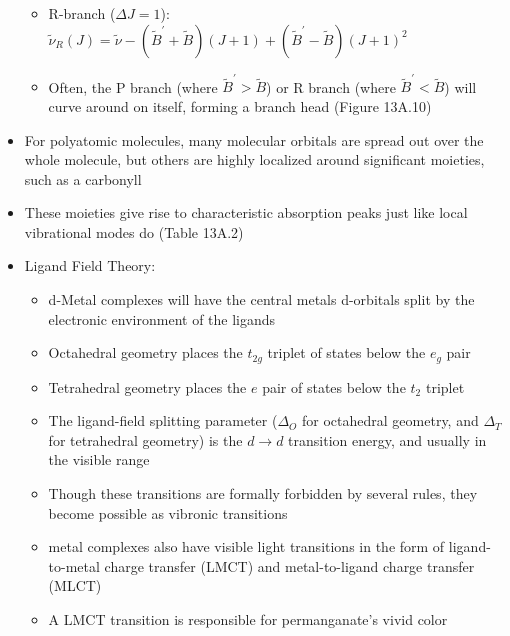 \documentclass[12pt, openany, letterpaper]{memoir}
\begin{document}
\begin{itemize}
\begin{itemize}
		\item R-branch ($\Delta J=1$):  $\tilde{\nu}_R(J) = \tilde{\nu}-\left(\tilde{B}^\prime + \tilde{B}\right)(J+1) + \left(\tilde{B}^\prime - \tilde{B}\right)(J+1)^2$
		\item Often, the P branch (where $\tilde{B}^\prime>\tilde{B}$) or R branch (where $\tilde{B}^\prime < \tilde{B}$) will curve around on itself, forming a branch  head (Figure 13A.10)
	\end{itemize}
	\item For polyatomic molecules, many molecular orbitals are spread out over the whole molecule, but others are highly localized around significant moieties, such as a carbonyll
	\item These moieties give rise to characteristic absorption peaks just like local vibrational modes do (Table 13A.2)
	\item Ligand Field Theory:
	\begin{itemize}
		\item d-Metal complexes will have the central metals d-orbitals split by the electronic environment of the ligands		
		\item Octahedral geometry places the $t_{2g}$ triplet of states below the $e_g$ pair
		\item Tetrahedral geometry places the $e$ pair of states below the $t_2$ triplet
		\item The ligand-field splitting parameter ($\Delta_O$ for octahedral geometry, and $\Delta_T$ for tetrahedral geometry) is the $d\rightarrow d$ transition energy, and usually in the visible range
		\item Though these transitions are formally forbidden by several rules, they become possible as vibronic transitions
		\item metal complexes also have visible light transitions in the form of ligand-to-metal charge transfer (LMCT) and metal-to-ligand charge transfer (MLCT)
		\item A LMCT transition is responsible for permanganate's vivid color
	\end{itemize}
\end{itemize}
\end{document}
